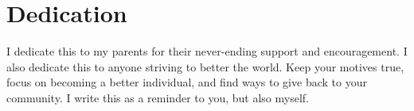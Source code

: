 \chapter*{Dedication}

I dedicate this to my parents for their never-ending support and encouragement. I also dedicate this to anyone striving to better the world. Keep your motives true, focus on becoming a better individual, and find ways to give back to your community. I write this as a reminder to you, but also myself. 
